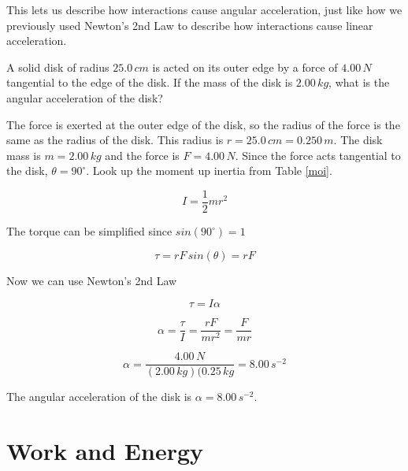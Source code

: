 \documentclass[12pt]{book}
\begin{document}
This lets us describe how interactions cause angular acceleration, just like how we previously used Newton's 2nd Law to describe how interactions cause linear acceleration.

\begin{exampleblock}

A solid disk of radius $25.0 \, cm$ is acted on its outer edge by a force of $4.00 \, N$ tangential to the edge of the disk. If the mass of the disk is $2.00 \, kg$, what is the angular acceleration of the disk?

\hspace{10pt}

The force is exerted at the outer edge of the disk, so the radius of the force is the same as the radius of the disk. This radius is $r = 25.0 \, cm = 0.250 \, m$. The disk mass is $m = 2.00 \, kg$ and the force is $F = 4.00 \, N$. Since the force acts tangential to the disk, $\theta = 90^{\circ}$. Look up the moment up inertia from Table \ref{moi}.

\begin{equation}
I = \frac{1}{2} m r^2
\end{equation}

The torque can be simplified since $sin(90^{\circ}) = 1$

\begin{equation}
\tau = rF \, sin(\theta) = rF
\end{equation}

Now we can use Newton's 2nd Law

\begin{equation}
\tau = I \alpha
\end{equation}

\begin{equation}
\alpha = \frac{\tau}{I} = \frac{rF}{mr^2} = \frac{F}{mr}
\end{equation}


\begin{equation}
\alpha = \frac{4.00 \, N}{(2.00 \, kg)(0.25 \, kg} = 8.00 \, s^{-2}
\end{equation}

The angular acceleration of the disk is $\alpha = 8.00 \, s^{-2}$.

\end{exampleblock}

\section{Work and Energy}
\end{document}
